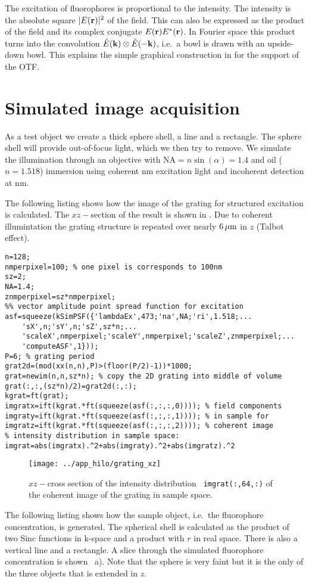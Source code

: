 The excitation of fluorophores is proportional to the intensity.  The
intensity is the absolute square $\mathopen| E(\mathbf{r}) \mathclose|^2$ of the field. This
can also be expressed as the product of the field and its complex
conjugate $E(\mathbf{r})E^*(\mathbf{r})$. In Fourier space this product turns into the
convolution $\tilde E(\mathbf{k})\otimes\tilde E(-\mathbf{k})$, i.e.\ a bowl is drawn
with an upside-down bowl. This explains the simple graphical
construction in  for the support of the OTF.

\section{Simulated image acquisition}
As a test object we create a thick sphere shell, a line and a
rectangle. The sphere shell will provide out-of-focus light, which we
then try to remove. We simulate the illumination through an objective
with $\textrm{NA}=n\sin(\alpha)=1.4$ and oil ($n=1.518$) immersion
using coherent \unit[473]{nm} excitation light and incoherent
detection at \unit[520]{nm}. 

The following listing shows how the image of the grating for
structured excitation is calculated. The $xz-$section of the result is
shown in . Due to coherent illumintation the
grating structure is repeated over nearly $\unit[6]{\mu m}$ in $z$
(Talbot effect).
\begin{lstlisting}
n=128;
nmperpixel=100; % one pixel is corresponds to 100nm
sz=2;
NA=1.4;
znmperpixel=sz*nmperpixel;
%% vector amplitude point spread function for excitation
asf=squeeze(kSimPSF({'lambdaEx',473;'na',NA;'ri',1.518;...
    'sX',n;'sY',n;'sZ',sz*n;...
    'scaleX',nmperpixel;'scaleY',nmperpixel;'scaleZ',znmperpixel;...
    'computeASF',1}));
P=6; % grating period
grat2d=(mod(xx(n,n),P)>(floor(P/2)-1))*1000;
grat=newim(n,n,sz*n); % copy the 2D grating into middle of volume
grat(:,:,(sz*n)/2)=grat2d(:,:);
kgrat=ft(grat);
imgratx=ift(kgrat.*ft(squeeze(asf(:,:,:,0)))); % field components
imgraty=ift(kgrat.*ft(squeeze(asf(:,:,:,1)))); % in sample for
imgratz=ift(kgrat.*ft(squeeze(asf(:,:,:,2)))); % coherent image
% intensity distribution in sample space:
imgrat=abs(imgratx).^2+abs(imgraty).^2+abs(imgratz).^2
\end{lstlisting}
\begin{figure}[htb]
  \centering
  \texttt{[image: ../app\_hilo/grating\_xz]}
  \caption{$xz-$cross section of the intensity distribution {\tt
      imgrat(:,64,:)} of the coherent image of the grating in sample
    space.}
  \label{fig:grating}
\end{figure}
The following listing shows how the sample object, i.e.\ the
fluorophore concentration, is generated.  The spherical shell is
calculated as the product of two Sinc functions in k-space and a
product with $r$ in real space. There is also a vertical line and a
rectangle. A slice through the simulated fluorophore concentration is
shown ~a). Note that the sphere is very faint but
it is the only of the three objects that is extended in $z$.

